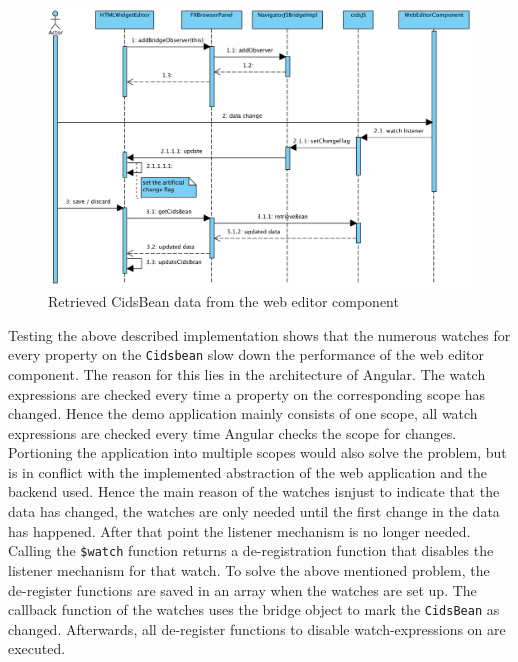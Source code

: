 \begin{figure}
	\centering	\includegraphics[width=1.0\textwidth]{./img/classDiagramms/seq_diag_data_exchange_2.png}
	\caption{Retrieved CidsBean data from the web editor component}
	\label{fig:seq-diag-data-exchange-2}
\end{figure}

Testing the above described implementation shows that the numerous watches for every property on the \texttt{Cidsbean} slow down the performance of the web editor component.
The reason for this lies in the architecture of Angular.
The watch expressions are checked every time a property on the corresponding scope has changed.
Hence the demo application mainly consists of one scope, all watch expressions are checked every time Angular checks the scope for changes.
Portioning the application into multiple scopes would also solve the problem, but is in conflict with the implemented abstraction of the web application and the backend used.
Hence the main reason of the watches isnjust to indicate that the data has changed, the watches are only needed until the first change in the data has happened. 
After that point the listener mechanism is no longer needed. 
Calling the \texttt{\$watch} function returns a de-registration function that disables the listener mechanism for that watch.
To solve the above mentioned problem, the de-register functions are saved in an array when the watches are set up. The callback function of the watches uses the bridge object to mark the \texttt{CidsBean} as changed. Afterwards, all de-register functions to disable watch-expressions on are executed. 

